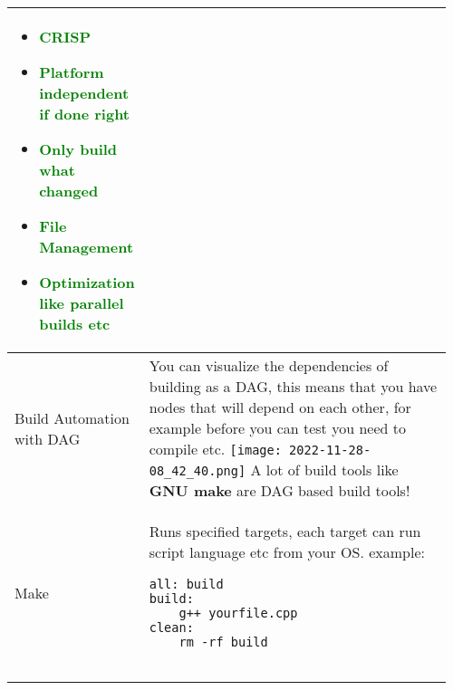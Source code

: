 \documentclass[main.tex,fontsize=8pt,paper=a4,paper=portrait,DIV=calc,]{scrartcl}
\begin{document}
\begin{table}[ht!]
\begin{tabular}{|m{0.2\linewidth}|m{0.755\linewidth}|}
\begin{itemize}
  \item \textcolor{green}{CRISP}
\item \textcolor{green}{Platform independent if done right}
\item \textcolor{green}{Only build what changed}
\item \textcolor{green}{File Management}
\item \textcolor{green}{Optimization like parallel builds etc}
\vspace{-3mm}
\end{itemize}\\
\hline
Build Automation with DAG & 
You can visualize the dependencies of building as a DAG, this means that you have nodes that will depend on each other, for example before you can test you need to compile etc.\newline
\texttt{[image: 2022-11-28-08\_42\_40.png]}\newline 
A lot of build tools like \textbf{GNU make} are DAG based build tools!\\
\hline
Make & 
Runs specified targets, each target can run script language etc from your OS.\newline
example:\newline
\begin{lstlisting}
all: build
build: 
    g++ yourfile.cpp
clean: 
    rm -rf build


\end{lstlisting}
\end{tabular}
\end{table}
\end{document}
